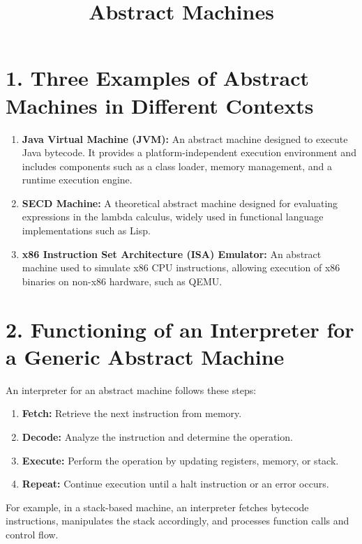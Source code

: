 \documentclass{article}
\title{Abstract Machines}
\author{}
\date{}
\begin{document}
\maketitle

\section*{1. Three Examples of Abstract Machines in Different Contexts}

\begin{enumerate}
    \item \textbf{Java Virtual Machine (JVM):} An abstract machine designed to execute Java bytecode. It provides a platform-independent execution environment and includes components such as a class loader, memory management, and a runtime execution engine.
    \item \textbf{SECD Machine:} A theoretical abstract machine designed for evaluating expressions in the lambda calculus, widely used in functional language implementations such as Lisp.
    \item \textbf{x86 Instruction Set Architecture (ISA) Emulator:} An abstract machine used to simulate x86 CPU instructions, allowing execution of x86 binaries on non-x86 hardware, such as QEMU.
\end{enumerate}

\section*{2. Functioning of an Interpreter for a Generic Abstract Machine}

An interpreter for an abstract machine follows these steps:

\begin{enumerate}[label=\textbf{\arabic*.}]
    \item \textbf{Fetch:} Retrieve the next instruction from memory.
    \item \textbf{Decode:} Analyze the instruction and determine the operation.
    \item \textbf{Execute:} Perform the operation by updating registers, memory, or stack.
    \item \textbf{Repeat:} Continue execution until a halt instruction or an error occurs.
\end{enumerate}

For example, in a stack-based machine, an interpreter fetches bytecode instructions, manipulates the stack accordingly, and processes function calls and control flow.
\end{document}
